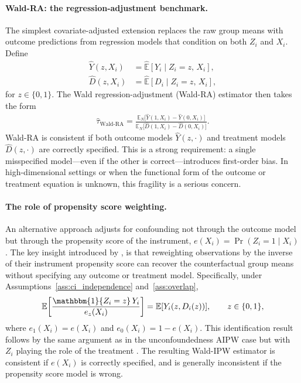 \documentclass[12pt,a4paper]{article}
\newcommand{\E}{\mathbb{E}}
\newcommand{\En}{\mathbb{E}_N}
\newcommand{\ind}{\mathbbm{1}}
\begin{document}
\paragraph{Wald-RA: the regression-adjustment benchmark.}

The simplest covariate-adjusted extension replaces the raw group means with outcome
predictions from regression models that condition on both $Z_i$ and $X_i$. Define
\begin{align}
    \hat{Y}(z, X_i) &= \widehat{\E}[Y_i \mid Z_i = z,\, X_i], \\[2pt]
    \hat{D}(z, X_i) &= \widehat{\E}[D_i \mid Z_i = z,\, X_i],
\end{align}
for $z \in \{0,1\}$. The Wald regression-adjustment (Wald-RA) estimator then takes the form
\begin{align}
    \hat{\tau}_{\mathrm{Wald\text{-}RA}}
    =
    \frac{
        \En\bigl[\hat{Y}(1, X_i) - \hat{Y}(0, X_i)\bigr]
    }{
        \En\bigl[\hat{D}(1, X_i) - \hat{D}(0, X_i)\bigr]
    }.
    \label{eq:wald_ra}
\end{align}
Wald-RA is consistent if both outcome models $\hat{Y}(z, \cdot)$ and treatment models
$\hat{D}(z, \cdot)$ are correctly specified. This is a strong requirement: a single
misspecified model---even if the other is correct---introduces first-order bias. In
high-dimensional settings or when the functional form of the outcome or treatment equation
is unknown, this fragility is a serious concern.

\paragraph{The role of propensity score weighting.}

An alternative approach adjusts for confounding not through the outcome model but through
the propensity score of the instrument,
$e(X_i) = \Pr(Z_i = 1 \mid X_i)$.
The key insight introduced by \citet{tan2006regression}, is that reweighting
observations by the inverse of their instrument propensity score can recover the counterfactual
group means without specifying any outcome or treatment model. Specifically, under
Assumptions~\ref{ass:ci_independence} and~\ref{ass:overlap},
\begin{align}
    \E\!\left[\frac{\ind\{Z_i = z\}\, Y_i}{e_z(X_i)}\right]
    =
    \E[Y_i(z, D_i(z))],
    \qquad
    z \in \{0,1\},
    \label{eq:ipw_id}
\end{align}
where $e_1(X_i) = e(X_i)$ and $e_0(X_i) = 1 - e(X_i)$. This identification result follows
by the same argument as in the unconfoundedness AIPW case but with $Z_i$ playing the
role of the treatment \citep[Proposition~1]{tan2006regression}. The resulting
Wald-IPW estimator is consistent if $e(X_i)$ is correctly specified, and is generally
inconsistent if the propensity score model is wrong.
\end{document}
